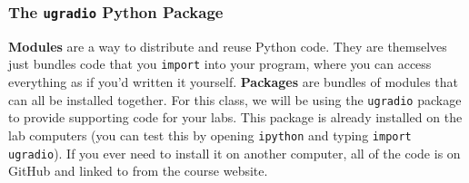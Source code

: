 \documentclass[11pt,preprint]{aastex}
\begin{document}
%
%
%
%
%
\subsubsection{The {\tt ugradio} Python Package}

\noindent
{\bf Modules} are a way to distribute and reuse Python code.  They are themselves
just bundles code that you {\tt import} into your program, where you can
access everything as if you'd written it yourself.  {\bf Packages} are bundles
of modules that can all be installed together.  For this class, we will be using
the {\tt ugradio} package to provide supporting code for your labs.  This package
is already installed on the lab computers (you can test this by opening {\tt ipython}
and typing {\tt import ugradio}).  If you ever need to install it on another computer,
all of the code is on GitHub and linked to from the course website.  
\end{document}
